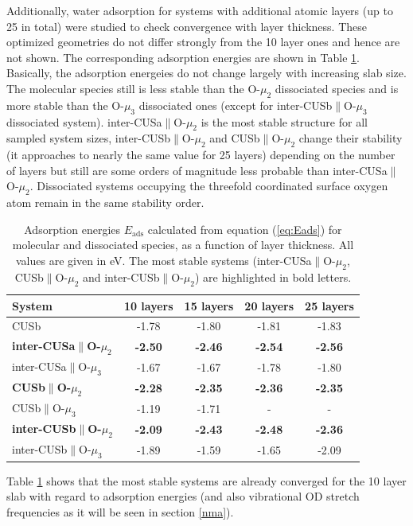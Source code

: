 \documentclass[11pt,DIV=13,BCOR=5mm,a4paper,headinclude]{scrbook}
\begin{document}
Additionally, water adsorption for systems with additional atomic layers (up to 25 in total) were studied to check convergence with layer thickness.
These optimized geometries do not differ strongly from the 10 layer ones and hence are not shown.
The corresponding adsorption energies are shown in Table \ref{tab:eads_layers}.
Basically, the adsorption energeies do not change largely with increasing slab size.
The molecular species still is less stable than the O-$\mu_2$ dissociated species and is more stable than the O-$\mu_3$ dissociated ones (except for inter-CUSb$\parallel$O-$\mu_3$ dissociated system).
inter-CUSa$\parallel$O-$\mu_2$ is the most stable structure for all sampled system sizes, inter-CUSb$\parallel$O-$\mu_2$ and CUSb$\parallel$O-$\mu_2$ change their stability (it approaches to nearly the same value for 25 layers) depending on the number of layers but still are some orders of magnitude less probable than inter-CUSa$\parallel$O-$\mu_2$.
Dissociated systems occupying the threefold coordinated surface oxygen atom remain in the same stability order.
\begin{table}[!ht]
  \centering
  \caption{Adsorption energies $E_\textrm{ads}$ calculated from equation (\ref{eq:Eads}) for molecular and dissociated species, as a function of layer thickness.
All values are given in eV.
The most stable systems (inter-CUSa$\parallel$O-$\mu_2$, CUSb$\parallel$O-$\mu_2$ and inter-CUSb$\parallel$O-$\mu_2$) are highlighted in bold letters.}
 \begin{tabular}{l|cccc}
 \toprule
 System                     & 10 layers& 15 layers& 20 layers& 25 layers \\\midrule
CUSb                                    &-1.78 &-1.80     &-1.81     &-1.83      \\\hline
\textbf{inter-CUSa$\parallel$O-$\mu_2$}    &\textbf{-2.50} &\textbf{-2.46} &\textbf{-2.54} &\textbf{-2.56}  \\
inter-CUSa$\parallel$O-$\mu_3$          &-1.67 &-1.67 &-1.78 &-1.80 \\
\textbf{CUSb$\parallel$O-$\mu_2$}          &\textbf{-2.28} &\textbf{-2.35} &\textbf{-2.36} &\textbf{-2.35} \\
CUSb$\parallel$O-$\mu_3$                &-1.19 &-1.71 &-     &-      \\
\textbf{inter-CUSb$\parallel$O-$\mu_2$}    &\textbf{-2.09} &\textbf{-2.43} &\textbf{-2.48} &\textbf{-2.36}  \\
inter-CUSb$\parallel$O-$\mu_3$          &-1.89 &-1.59 &-1.65 &-2.09 \\\bottomrule
\end{tabular}
\label{tab:eads_layers}
\end{table}
Table \ref{tab:eads_layers} shows that the most stable systems are already converged for the 10 layer slab with regard to adsorption energies (and also vibrational OD stretch frequencies as it will be seen in section \ref{nma}).
\end{document}
